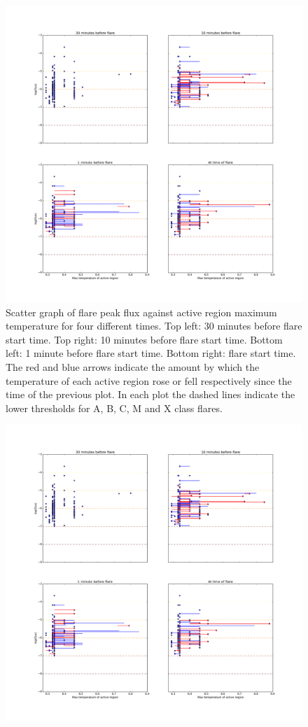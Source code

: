 \documentclass[referee,a4paper,12pt,traditabstract]{swsc}
\begin{document}
\begin{linenumbers}

\begin{figure}
	\centering
		\includegraphics[width=0.9\columnwidth]{tempplotsmax/allflares.png}
	\caption{Scatter graph of flare peak flux against active region maximum temperature for four different times. Top left: 30 minutes before flare start time. Top right: 10 minutes before flare start time. Bottom left: 1 minute before flare start time. Bottom right: flare start time. The red and blue arrows indicate the amount by which the temperature of each active region rose or fell respectively since the time of the previous plot. In each plot the dashed lines indicate the lower thresholds for A, B, C, M and X class flares.}
	\label{fig:allflares_max}
\end{figure}
\begin{figure}
	\centering
		\includegraphics[width=0.9\columnwidth]{tempplotsmax/allflares.png}

\end{figure}
\end{linenumbers}
\end{document}
